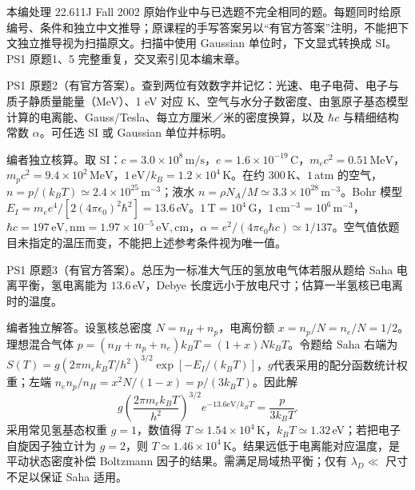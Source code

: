 本编处理 22.611J Fall 2002 原始作业中与已选题不完全相同的题。每题同时给原编号、条件和独立中文推导；原课程的手写答案另以“有官方答案”注明，不能把下文独立推导视为扫描原文。扫描中使用 Gaussian 单位时，下文显式转换成 SI。PS1 原题1、5 完整重复，交叉索引见本编末章。

\begin{exercise}\label{ex:hist02-1-2}
PS1 原题2（有官方答案）。查到两位有效数字并记忆：光速、电子电荷、电子与质子静质量能量（MeV）、1 eV 对应 K、空气与水分子数密度、由氢原子基态模型计算的电离能、Gauss/Tesla、每立方厘米／米的密度换算，以及 $\hbar c$ 与精细结构常数 $\alpha$。可任选 SI 或 Gaussian 单位并标明。
\end{exercise}
\begin{solution}
编者独立核算。取 SI：$c=3.0\times10^8\,\mathrm{m/s}$，$e=1.6\times10^{-19}\,\mathrm C$，$m_ec^2=0.51\,\mathrm{MeV}$，$m_pc^2=9.4\times10^2\,\mathrm{MeV}$，$1\,\mathrm{eV}/k_B=1.2\times10^4\,\mathrm K$。在约 $300\,$K、$1\,$atm 的空气，$n=p/(k_BT)\simeq2.4\times10^{25}\,\mathrm{m^{-3}}$；液水 $n=\rho N_A/M\simeq3.3\times10^{28}\,\mathrm{m^{-3}}$。Bohr 模型 $E_I=m_ee^4/[2(4\pi\epsilon_0)^2\hbar^2]=13.6\,$eV。$1\,\mathrm T=10^4\,\mathrm G$，$1\,\mathrm{cm^{-3}}=10^6\,\mathrm{m^{-3}}$，$\hbar c=197\,\mathrm{eV,nm}=1.97\times10^{-5}\,\mathrm{eV,cm}$，$\alpha=e^2/(4\pi\epsilon_0\hbar c)\simeq1/137$。空气值依题目未指定的温压而变，不能把上述参考条件视为唯一值。
\end{solution}

\begin{exercise}\label{ex:hist02-1-3}
PS1 原题3（有官方答案）。总压为一标准大气压的氢放电气体若服从题给 Saha 电离平衡，氢电离能为 $13.6\,$eV，Debye 长度远小于放电尺寸；估算一半氢核已电离时的温度。
\end{exercise}
\begin{solution}
编者独立解答。设氢核总密度 $N=n_H+n_p$，电离份额 $x=n_p/N=n_e/N=1/2$。理想混合气体 $p=(n_H+n_p+n_e)k_BT=(1+x)Nk_BT$。令题给 Saha 右端为 $S(T)=g(2\pi m_ek_BT/h^2)^{3/2}\exp[-E_I/(k_BT)]$，$g$代表采用的配分函数统计权重；左端 $n_en_p/n_H=x^2N/(1-x)=p/(3k_BT)$。因此解
\begin{equation}g\left(\frac{2\pi m_ek_BT}{h^2}\right)^{3/2}e^{-13.6\mathrm{eV}/k_BT}=\frac{p}{3k_BT}.
\end{equation}
采用常见氢基态权重 $g=1$，数值得 $T\simeq1.54\times10^4\,$K，$k_BT\simeq1.32\,$eV；若把电子自旋因子独立计为 $g=2$，则 $T\simeq1.46\times10^4\,$K。结果远低于电离能对应温度，是平动状态密度补偿 Boltzmann 因子的结果。需满足局域热平衡；仅有 $\lambda_D\ll$ 尺寸不足以保证 Saha 适用。
\end{solution}

